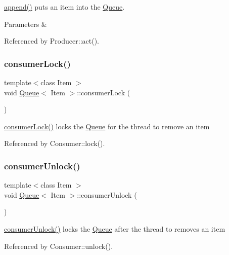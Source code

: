 \hyperlink{class_queue_af529bb8ea595f04a4e001235d9fa9500}{append()} puts an item into the \hyperlink{class_queue}{Queue}. 
\begin{DoxyParams}{Parameters}
{\em } & \\
\hline
\end{DoxyParams}


Referenced by Producer\+::act().

\mbox{\label{class_queue_aabd949416973cd50003caef588488ce5}} 
\subsubsection{\texorpdfstring{consumer\+Lock()}{consumerLock()}}
{\footnotesize\ttfamily template$<$class Item $>$ \\
void \hyperlink{class_queue}{Queue}$<$ Item $>$\+::consumer\+Lock (\begin{DoxyParamCaption}{ }\end{DoxyParamCaption})}

\hyperlink{class_queue_aabd949416973cd50003caef588488ce5}{consumer\+Lock()} locks the \hyperlink{class_queue}{Queue} for the thread to remove an item 

Referenced by Consumer\+::lock().

\mbox{\label{class_queue_af2fc30d17cd216e65174f81bf30077e7}} 
\subsubsection{\texorpdfstring{consumer\+Unlock()}{consumerUnlock()}}
{\footnotesize\ttfamily template$<$class Item $>$ \\
void \hyperlink{class_queue}{Queue}$<$ Item $>$\+::consumer\+Unlock (\begin{DoxyParamCaption}{ }\end{DoxyParamCaption})}

\hyperlink{class_queue_af2fc30d17cd216e65174f81bf30077e7}{consumer\+Unlock()} locks the \hyperlink{class_queue}{Queue} after the thread to removes an item 

Referenced by Consumer\+::unlock().

\mbox{\label{class_queue_ab1da66d1953215740872a16e8209b105}} 
